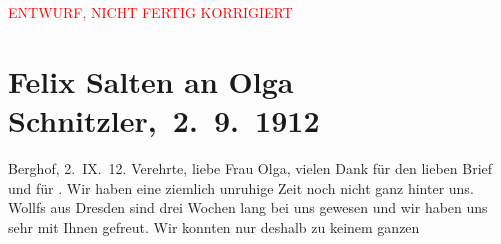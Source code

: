 
\begin{center}
            \textcolor{red}{ENTWURF, NICHT FERTIG KORRIGIERT}
                      \end{center}
            
         
         \renewcommand{\erwaehntePersonen}{Personen:  ?? [Haushaltshilfe der Familie Salten 1912], Samuel Fischer, Hedwig Fischer, Richard Kralik, Felix Salten, Ottilie Salten, Olga Schnitzler, Emil Schwarz, Elisabeth Steinrück, Julius Ferdinand Wollf, Johanna Sophie Wollf}
         \renewcommand{\erwaehnteInstitutionen}{Institutionen: Burgtheater}
         \renewcommand{\erwaehnteOrte}{Orte: Berghof, Cottagegasse, Dresden, München, Sanatorium Hera, Unterach am Attersee, Wien}
         \renewcommand{\erwaehnteWerke}{}
               \section[ Felix Salten an Olga Schnitzler, 2. 9. 1912]{ Felix Salten an Olga Schnitzler, 2. 9. 1912}\nopagebreak{}\rehead{ }\begin{ledgroupsized}[t]{13cm}\normalsize\beginnumbering \toendnotes[C]{\smallbreak\pagebreak[2]} 
\toendnotes[C]{\smallbreak}\pstart
           \raggedleft{}{\pb}Berghof, 2. IX. 12.\pend
           \pstart{}Verehrte, liebe Frau Olga,\pend\pstart
           vielen Dank für den lieben Brief und für \label{K_L03560-1v}\label{K_L03560-1h}. Wir haben eine ziemlich unruhige Zeit
               noch nicht ganz hinter uns. Wollfs
               aus Dresden sind drei Wochen lang bei uns gewesen
               und wir haben uns sehr mit Ihnen gefreut. Wir konnten nur deshalb zu keinem ganzen

\end{ledgroupsized}
